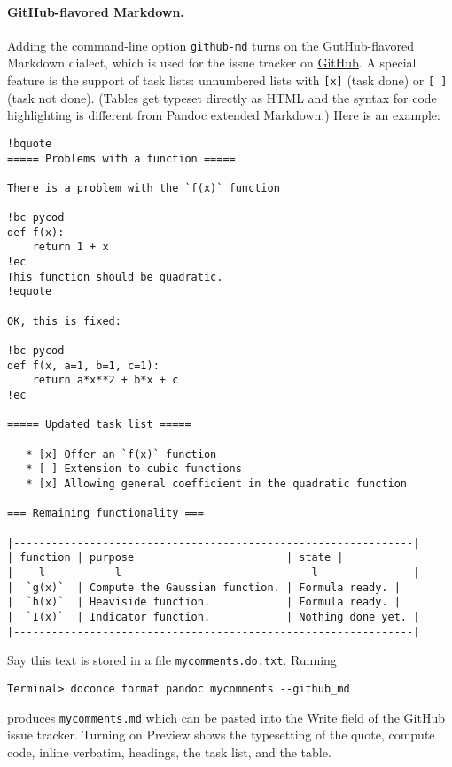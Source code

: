 \documentclass[%
oneside,                 %
final,                   %
10pt]{article}
\begin{document}
\paragraph{GitHub-flavored Markdown.}
Adding the command-line option {\fontsize{10pt}{10pt}\Verb!github-md!} turns on the GutHub-flavored
Markdown dialect, which is used for the issue tracker on \href{{http://github.com}}{GitHub}. A special feature is the support of task lists:
unnumbered lists with {\fontsize{10pt}{10pt}\Verb![x]!} (task done) or {\fontsize{10pt}{10pt}\Verb![ ]!} (task not done).
(Tables get typeset directly as HTML and the syntax for code highlighting
is different from Pandoc extended Markdown.) Here is an example:

\begin{Verbatim}[fontsize=\fontsize{9pt}{9pt},tabsize=8,baselinestretch=0.85,fontfamily=tt,xleftmargin=7mm]
!bquote
===== Problems with a function =====

There is a problem with the `f(x)` function

!bc pycod
def f(x):
    return 1 + x
!ec
This function should be quadratic.
!equote

OK, this is fixed:

!bc pycod
def f(x, a=1, b=1, c=1):
    return a*x**2 + b*x + c
!ec

===== Updated task list =====

   * [x] Offer an `f(x)` function
   * [ ] Extension to cubic functions
   * [x] Allowing general coefficient in the quadratic function

=== Remaining functionality ===

|---------------------------------------------------------------|
| function | purpose                        | state |
|----l-----------l------------------------------l---------------|
|  `g(x)`  | Compute the Gaussian function. | Formula ready. |
|  `h(x)`  | Heaviside function.            | Formula ready. |
|  `I(x)`  | Indicator function.            | Nothing done yet. |
|---------------------------------------------------------------|
\end{Verbatim}
\noindent
Say this text is stored in a file {\fontsize{10pt}{10pt}\Verb!mycomments.do.txt!}. Running

\vspace{4pt}
\begin{Verbatim}[numbers=none,frame=lines,fontsize=\fontsize{9pt}{9pt},labelposition=topline,framesep=2.5mm,framerule=0.7pt]
Terminal> doconce format pandoc mycomments --github_md
\end{Verbatim}
produces {\fontsize{10pt}{10pt}\Verb!mycomments.md!} which can be pasted into the Write field of
the GitHub issue tracker. Turning on Preview shows the typesetting of
the quote, compute code, inline verbatim, headings, the task list, and
the table.
\end{document}
